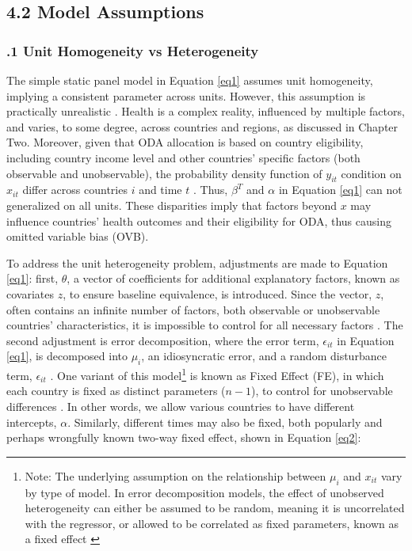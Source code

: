 \subsection*{4.2 Model Assumptions}
\subsubsection*{.1  Unit Homogeneity vs Heterogeneity}
The simple static panel model in Equation \ref{eq1} assumes unit homogeneity, implying a consistent parameter across units. However, this assumption is practically unrealistic \parencite{hsiao2007panel}. Health is a complex reality, influenced by multiple factors, and varies, to some degree, across countries and regions, as discussed in Chapter Two. 
Moreover, given that ODA allocation is based on country eligibility, including country income level \parencite{oecd_ODA_Report_2023} and other countries' specific factors (both observable and unobservable), the probability density function of $y_{it}$ condition on $x_{it}$ differ across countries $i$ and time $t$ \parencite{berrington2006overview, borenstein2010basic, hsiao2007panel}. Thus, $\beta^T$ and $\alpha$ in Equation \ref{eq1} can not generalized on all units. These disparities imply that factors beyond $x$ may influence countries' health outcomes and their eligibility for ODA, thus causing omitted variable bias (OVB). 


To address the unit heterogeneity problem, adjustments are made to Equation \ref{eq1}: first, $\theta$, a vector of coefficients for additional explanatory factors, known as covariates $z$, to ensure baseline equivalence, is introduced. Since the vector, $ z $, often contains an infinite number of factors, both observable or unobservable countries' characteristics, it is impossible to control for all necessary factors \parencite{hsiao2007panel}. The second adjustment is error decomposition, where the error term, $\epsilon_{it}$ in Equation \ref{eq1}, is decomposed into $ \mu_i $, an idiosyncratic error, and a random disturbance term,  $ \epsilon_{it} $ \parencite{becker2023many, borenstein2010basic}. One variant of this model\footnote{Note: The underlying assumption on the relationship between  $\mu_i$ and $x_{it}$ vary by type of model. In error decomposition models, the effect of unobserved heterogeneity can either be assumed to be random, meaning it is uncorrelated with the regressor, or allowed to be correlated as fixed parameters, known as a fixed effect \parencite{hsiao2007panel}} is known as Fixed Effect (FE), in which each country is fixed as distinct parameters ($n-1$), to control for unobservable differences \parencite{seddig2020maximum, becker2023many, borenstein2010basic}. In other words, we allow various countries to have different intercepts, $\alpha$. Similarly, different times may also be fixed, both popularly and perhaps wrongfully known two-way fixed effect, shown in Equation \ref{eq2}:


